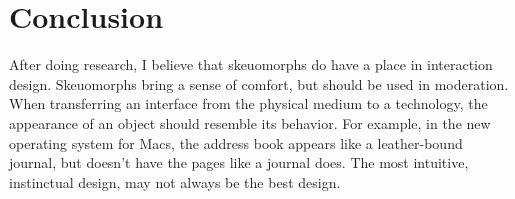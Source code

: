 \documentclass{article}
\begin{document}
\section{Conclusion}

	After doing research, I believe that skeuomorphs do have a place in interaction design. Skeuomorphs bring a sense of comfort, but should be used in moderation. When transferring an interface from the physical medium to a technology, the appearance of an object should resemble its behavior. For example, in the new operating system for Macs, the address book appears like a leather-bound journal, but doesn’t have the pages like a journal does. The most intuitive, instinctual design, may not always be the best design.
	


\end{document}
